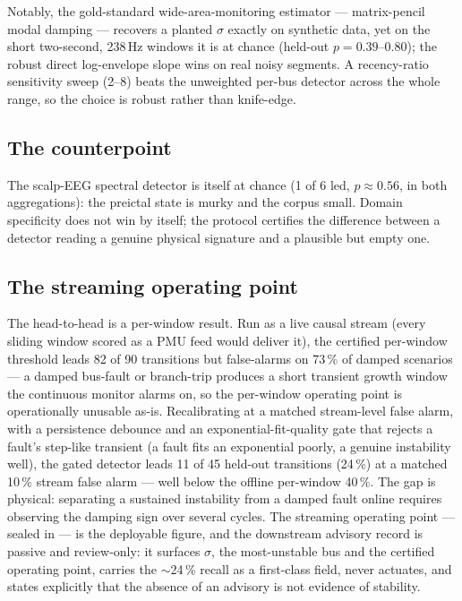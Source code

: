 \documentclass[journal]{IEEEtran}
\begin{document}
Notably, the gold-standard wide-area-monitoring estimator ---
matrix-pencil modal damping --- recovers a planted $\sigma$ exactly on
synthetic data, yet on the short two-second, 238\,Hz windows it is at
chance (held-out $p = 0.39$--$0.80$); the robust direct log-envelope
slope wins on real noisy segments. A recency-ratio sensitivity sweep
(2--8) beats the unweighted per-bus detector across the whole range, so
the choice is robust rather than knife-edge.

\subsection{The counterpoint}

The scalp-EEG spectral detector is itself at chance (1 of 6 led,
$p \approx 0.56$, in both aggregations): the preictal state is murky
and the corpus small. Domain specificity does not win by itself; the
protocol certifies the difference between a detector reading a genuine
physical signature and a plausible but empty one.

\subsection{The streaming operating point}\label{sec:stream}

The head-to-head is a per-window result. Run as a live causal stream
(every sliding window scored as a PMU feed would deliver it), the
certified per-window threshold leads 82 of 90 transitions but
false-alarms on 73\,\% of damped scenarios --- a damped bus-fault or
branch-trip produces a short transient growth window the continuous
monitor alarms on, so the per-window operating point is operationally
unusable as-is. Recalibrating at a matched stream-level false alarm,
with a persistence debounce and an exponential-fit-quality gate that
rejects a fault's step-like transient (a fault fits an exponential
poorly, a genuine instability well), the gated detector leads 11 of 45
held-out transitions (24\,\%) at a matched 10\,\% stream false alarm
--- well below the offline per-window 40\,\%. The gap is physical:
separating a sustained instability from a damped fault online requires
observing the damping sign over several cycles. The streaming operating
point --- sealed in
--- is the deployable figure, and the downstream advisory record is
passive and review-only: it surfaces $\sigma$, the most-unstable bus
and the certified operating point, carries the $\sim$24\,\% recall as a
first-class field, never actuates, and states explicitly that the
absence of an advisory is not evidence of stability.
\end{document}
